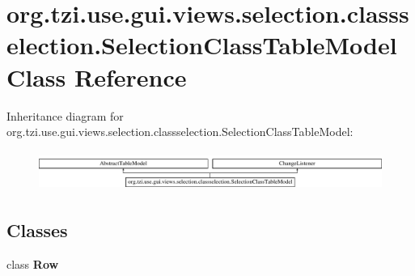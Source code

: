 \hypertarget{classorg_1_1tzi_1_1use_1_1gui_1_1views_1_1selection_1_1classselection_1_1_selection_class_table_model}{\section{org.\-tzi.\-use.\-gui.\-views.\-selection.\-classselection.\-Selection\-Class\-Table\-Model Class Reference}
\label{classorg_1_1tzi_1_1use_1_1gui_1_1views_1_1selection_1_1classselection_1_1_selection_class_table_model}
}
Inheritance diagram for org.\-tzi.\-use.\-gui.\-views.\-selection.\-classselection.\-Selection\-Class\-Table\-Model\-:\begin{figure}[H]
\begin{center}
\leavevmode
\includegraphics[height=1.314554cm]{classorg_1_1tzi_1_1use_1_1gui_1_1views_1_1selection_1_1classselection_1_1_selection_class_table_model}
\end{center}
\end{figure}
\subsection*{Classes}
\begin{DoxyCompactItemize}
\item 
class {\bfseries Row}
\end{DoxyCompactItemize}
